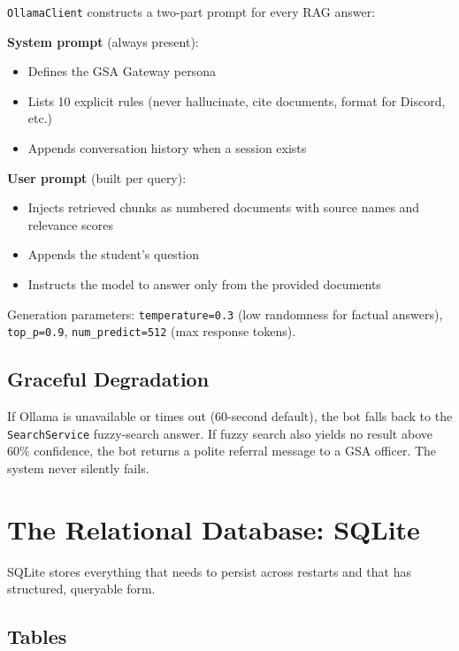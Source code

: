 \documentclass[12pt,letterpaper]{article}
\begin{document}
\texttt{OllamaClient} constructs a two-part prompt for every RAG answer:

\textbf{System prompt} (always present):
\begin{itemize}[leftmargin=2em]
  \item Defines the GSA Gateway persona
  \item Lists 10 explicit rules (never hallucinate, cite documents, format for Discord, etc.)
  \item Appends conversation history when a session exists
\end{itemize}

\textbf{User prompt} (built per query):
\begin{itemize}[leftmargin=2em]
  \item Injects retrieved chunks as numbered documents with source names and relevance scores
  \item Appends the student's question
  \item Instructs the model to answer only from the provided documents
\end{itemize}

Generation parameters: \texttt{temperature=0.3} (low randomness for factual
answers), \texttt{top\_p=0.9}, \texttt{num\_predict=512} (max response tokens).

\subsection{Graceful Degradation}

If Ollama is unavailable or times out (60-second default), the bot falls back to
the \texttt{SearchService} fuzzy-search answer. If fuzzy search also yields no
result above 60\% confidence, the bot returns a polite referral message to a
GSA officer. The system never silently fails.

\section{The Relational Database: SQLite}

SQLite stores everything that needs to persist across restarts and that has
structured, queryable form.

\subsection{Tables}
\end{document}
